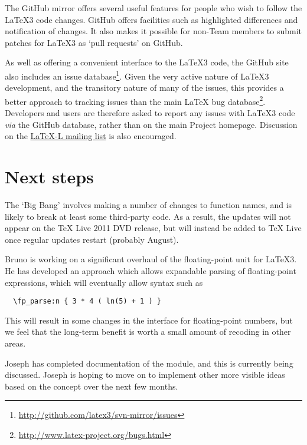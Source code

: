 \documentclass{ltnews}
\begin{document}
The GitHub mirror offers several useful features for people who wish to
follow the \LaTeX3 code changes. GitHub offers facilities such as highlighted
differences and notification of changes. It also makes it possible for
non-Team members to submit patches for \LaTeX3 as `pull requests' on
GitHub.

As well as offering a convenient interface to the \LaTeX3 code, the GitHub
site also includes an issue database\footnote{%
\url{http://github.com/latex3/svn-mirror/issues}}. Given the very
active nature of \LaTeX3 development, and the transitory nature of many
of the issues, this provides a better approach to tracking issues than
the main \LaTeX{} bug database\footnote{\url{http://www.latex-project.org/bugs.html}}.
Developers and users are
therefore asked to report any issues with \LaTeX3 code \emph{via} the GitHub
database, rather than on the main Project homepage.
Discussion on the \href{http://www.latex-project.org/code.html}{\mbox{LaTeX-L} mailing list}
is also encouraged.

\section{Next steps}

The `Big Bang' involves making a number of changes to  function
names, and is likely to break at least some third-party code. As a result,
the updates will not appear on the \TeX{} Live 2011 DVD release, but will
instead be added to \TeX{} Live once regular updates restart (probably
August).

Bruno is working on a significant overhaul of the  floating-point
unit for \LaTeX3. He has developed an approach which allows expandable
parsing of floating-point expressions, which will eventually allow syntax
such as
\begin{verbatim}
  \fp_parse:n { 3 * 4 ( ln(5) + 1 ) }
\end{verbatim}
This will result in some changes in the interface for floating-point numbers, but
we feel that the long-term benefit is worth a small amount of recoding in other
areas.

Joseph has completed documentation of the  module, and this is
currently being discussed. Joseph is hoping to move on to implement other
more visible ideas based on the  concept over the next few
months.
\end{document}
